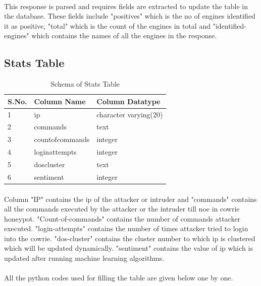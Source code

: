 \documentclass{article}
\begin{document}


\paragraph{}
This response is parsed and requires fields are extracted to update the table in the database. These fields include "positives" which is the no of engines identified it as positive, "total" which is the count of the engines in total  and "identified-engines" which contains the names of all the engines in the response.


\subsection{Stats Table}

\begin{table}[H]
\begin{tabular}{ |p{2cm}|p{5cm}|p{5cm}|  }
 \hline
 \textbf{S.No.} & \textbf{Column Name} & \textbf{Column Datatype}\\
 \hline
 \hline
 1 & ip & character varying(20) \\
 \hline
2 & commands & text \\
\hline
3 & countofcommands & integer \\
\hline
4 & loginattempts & integer \\
\hline
5 & doscluster & text \\
\hline
6 & sentiment & integer \\
\hline
\end{tabular}
 \caption{Schema of Stats Table}
\end{table}

 
\paragraph{}
Column "IP" contains the ip of the attacker or intruder and "commands" contains all the commands executed by the attacker or the intruder till noe in cowrie honeypot. "Count-of-commands" contains the number of commands attacker executed. "login-attempts" contains the number of times attacker tried to login into the cowrie. "dos-cluster" contains the cluster number to which ip is clustered which will be updated dynamically. "sentiment" contains the value of ip which is updated after running machine learning algorithms.

\paragraph{}
All the python codes used for filling the table are given below one by one.
\end{document}
